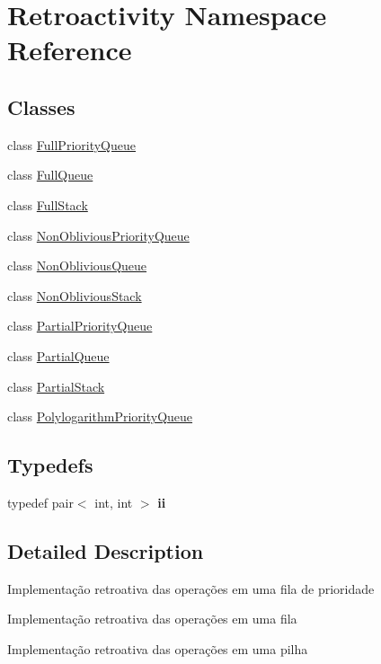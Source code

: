 \hypertarget{namespaceRetroactivity}{}\section{Retroactivity Namespace Reference}
\label{namespaceRetroactivity}
\subsection*{Classes}
\begin{DoxyCompactItemize}
\item 
class \hyperlink{classRetroactivity_1_1FullPriorityQueue}{Full\+Priority\+Queue}
\item 
class \hyperlink{classRetroactivity_1_1FullQueue}{Full\+Queue}
\item 
class \hyperlink{classRetroactivity_1_1FullStack}{Full\+Stack}
\item 
class \hyperlink{classRetroactivity_1_1NonObliviousPriorityQueue}{Non\+Oblivious\+Priority\+Queue}
\item 
class \hyperlink{classRetroactivity_1_1NonObliviousQueue}{Non\+Oblivious\+Queue}
\item 
class \hyperlink{classRetroactivity_1_1NonObliviousStack}{Non\+Oblivious\+Stack}
\item 
class \hyperlink{classRetroactivity_1_1PartialPriorityQueue}{Partial\+Priority\+Queue}
\item 
class \hyperlink{classRetroactivity_1_1PartialQueue}{Partial\+Queue}
\item 
class \hyperlink{classRetroactivity_1_1PartialStack}{Partial\+Stack}
\item 
class \hyperlink{classRetroactivity_1_1PolylogarithmPriorityQueue}{Polylogarithm\+Priority\+Queue}
\end{DoxyCompactItemize}
\subsection*{Typedefs}
\begin{DoxyCompactItemize}
\item 
\mbox{\label{namespaceRetroactivity_a1174f65a337a412b410baf9bcea8aa80}} 
typedef pair$<$ int, int $>$ {\bfseries ii}
\end{DoxyCompactItemize}


\subsection{Detailed Description}
Implementação retroativa das operações em uma fila de prioridade

Implementação retroativa das operações em uma fila

Implementação retroativa das operações em uma pilha 
